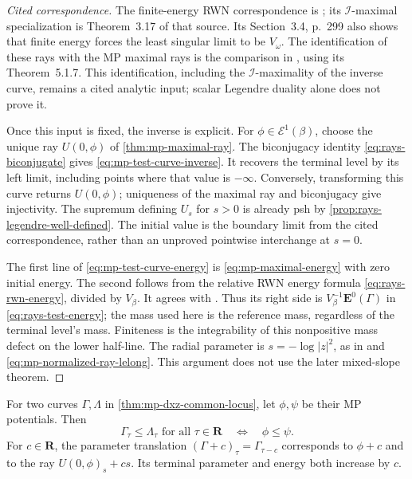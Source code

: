 \begin{proof}[Cited correspondence]
The finite-energy RWN correspondence is \cite[Theorem~2.6(iii)]{DXZ23}; its $\mathcal I$-maximal specialization is Theorem~3.17 of that source. Its Section~3.4, p.~299 also shows that finite energy forces the least singular limit to be $V_\omega$. The identification of these rays with the MP maximal rays is the comparison in \cite[Section~5.2, p.~48]{MPTropicalV2}, using its Theorem~5.1.7. This identification, including the $\mathcal I$-maximality of the inverse curve, remains a cited analytic input; scalar Legendre duality alone does not prove it.

Once this input is fixed, the inverse is explicit. For $\phi\in\mathcal E^1(\beta)$, choose the unique ray $U(0,\phi)$ of \cref{thm:mp-maximal-ray}. The biconjugacy identity \eqref{eq:rays-biconjugate} gives \eqref{eq:mp-test-curve-inverse}. It recovers the terminal level by its left limit, including points where that value is $-\infty$. Conversely, transforming this curve returns $U(0,\phi)$; uniqueness of the maximal ray and biconjugacy give injectivity. The supremum defining $U_s$ for $s>0$ is already psh by \cref{prop:rays-legendre-well-defined}. The initial value is the boundary limit from the cited correspondence, rather than an unproved pointwise interchange at $s=0$.

The first line of \eqref{eq:mp-test-curve-energy} is \eqref{eq:mp-maximal-energy} with zero initial energy. The second follows from the relative RWN energy formula \eqref{eq:rays-rwn-energy}, divided by $V_\beta$. It agrees with \cite[Section~3.4, equation~(34)]{DXZ23}. Thus its right side is $V_\beta^{-1}\mathbf E^0(\Gamma)$ in \eqref{eq:rays-test-energy}; the mass used here is the reference mass, regardless of the terminal level's mass. Finiteness is the integrability of this nonpositive mass defect on the lower half-line. The radial parameter is $s=-\log|z|^2$, as in \cite[equations~(6), (10)]{DXZ23} and \eqref{eq:mp-normalized-ray-lelong}. This argument does not use the later mixed-slope theorem.
\end{proof}

\begin{proposition}\label{prop:mp-test-curve-order-translation}
For two curves $\Gamma,\Lambda$ in \cref{thm:mp-dxz-common-locus}, let $\phi,\psi$ be their MP potentials. Then
\[
 \Gamma_\tau\leq\Lambda_\tau\text{ for all }\tau\in\mathbf R
 \quad\Longleftrightarrow\quad \phi\leq\psi.
\]
For $c\in\mathbf R$, the parameter translation $(\Gamma+c)_\tau=\Gamma_{\tau-c}$ corresponds to $\phi+c$ and to the ray $U(0,\phi)_s+cs$. Its terminal parameter and energy both increase by $c$.
\end{proposition}

